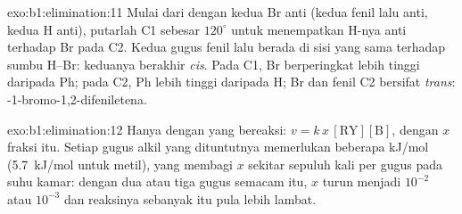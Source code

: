 \begin{solution}{exo:b1:elimination:11}
Mulai dari   dengan kedua Br anti (kedua fenil lalu
anti, kedua H anti), putarlah C1 sebesar $120^\circ$ untuk menempatkan
H-nya anti terhadap Br pada C2. Kedua gugus fenil lalu berada di sisi
yang sama terhadap sumbu H--Br: keduanya berakhir \textit{cis}. Pada C1,
Br berperingkat lebih tinggi daripada Ph; pada C2, Ph lebih tinggi
daripada H; Br dan fenil C2 bersifat \textit{trans}:
-1-bromo-1,2-difeniletena.
\end{solution}

\begin{solution}{exo:b1:elimination:12}
Hanya  dengan   yang bereaksi: $v = k\,x\,[\mathrm{RY}][\mathrm{B}]$,
dengan $x$ fraksi  itu. Setiap gugus alkil  yang dituntutnya
memerlukan beberapa kJ/mol (\qty{5.7}{kJ/mol} untuk metil), yang membagi
$x$ sekitar sepuluh kali per gugus pada suhu kamar: dengan dua atau tiga
gugus semacam itu, $x$ turun menjadi $10^{-2}$ atau $10^{-3}$ dan
reaksinya sebanyak itu pula lebih lambat.
\end{solution}

